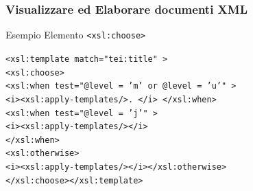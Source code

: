     

    

\begin{frame}
    \frametitle{Visualizzare ed Elaborare documenti XML}
    \addtocounter{nframe}{1}
    

     \begin{block}{Esempio Elemento \texttt{<xsl:choose>}}
        
        \texttt{<xsl:template match="tei:title" >}
        \\\texttt{<xsl:choose>}
        \\\texttt{<xsl:when test="@level = 'm' or @level = 'u'" >}
        \\\texttt{<i><xsl:apply-templates/>. </i> </xsl:when>}
        \\\texttt{<xsl:when test="@level = 'j'" >}
        \\\texttt{<i><xsl:apply-templates/></i>}
        \\\texttt{</xsl:when>}
        \\\texttt{<xsl:otherwise>}
        \\\texttt{<i><xsl:apply-templates/></i></xsl:otherwise>}
        \\\texttt{</xsl:choose></xsl:template>}
     \end{block}

\end{frame}

